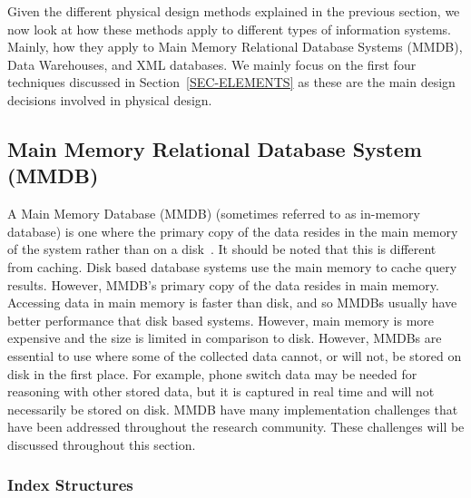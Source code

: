 \documentclass[12pt,a4paper]{article}
\begin{document}
Given the different physical design methods explained in the previous section, we now look at how these methods apply to different types of information systems.
Mainly, how they apply to Main Memory Relational Database Systems (MMDB), Data Warehouses, and XML databases. We mainly focus
on the first four techniques discussed in Section~\ref{SEC-ELEMENTS} as these are the main design decisions involved in physical design.

\subsection{Main Memory Relational Database System (MMDB)}
\label{SEC-MMDB}

A Main Memory Database (MMDB) (sometimes referred to as in-memory database) is one where the primary copy of the data resides in the main memory of the system
rather than on a
disk~\cite{garcia1992main}. It should be noted that this is different from caching. Disk based database systems use the main memory to cache query results.
However, MMDB's primary copy of the data resides in main memory. Accessing data in main memory is faster than disk, and so MMDBs usually have better
performance that disk based systems. However, main memory is more expensive and the size is limited in comparison to disk. However, MMDBs are essential to use
where some of the collected data cannot, or will not, be stored on disk in the first place. For example, phone switch data may be needed for reasoning with
other stored data, but it is captured in real time and will not necessarily be stored on disk. MMDB have many implementation challenges that have been addressed
throughout the research community. These challenges will be discussed throughout this section. 

\subsubsection{Index Structures}
\end{document}
